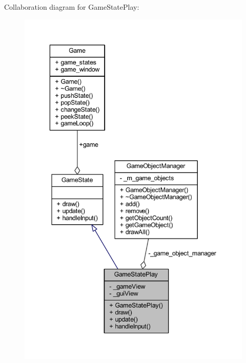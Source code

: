 Collaboration diagram for Game\+State\+Play\+:
\nopagebreak
\begin{figure}[H]
\begin{center}
\leavevmode
\includegraphics[width=342pt]{class_game_state_play__coll__graph}
\end{center}
\end{figure}

